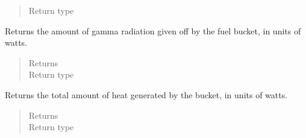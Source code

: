 \documentclass[letterpaper,10pt,openany,oneside,english]{sphinxmanual}
\begin{document}
\begin{fulllineitems}
\begin{fulllineitems}
\begin{quote}
\begin{description}
\item[{Return type}] \leavevmode
{}

\end{description}\end{quote}

\end{fulllineitems}


\begin{fulllineitems}
\label{\detokenize{support_rst/fuel_bucket:fuel_bucket.FuelBucket.get_gamma_pwr}}
Returns the amount of gamma radiation given off by the fuel bucket,
in units of watts.
\begin{quote}\begin{description}
\item[{Returns}] \leavevmode
{}

\item[{Return type}] \leavevmode
{}

\end{description}\end{quote}

\end{fulllineitems}


\begin{fulllineitems}
\label{\detokenize{support_rst/fuel_bucket:fuel_bucket.FuelBucket.get_heat_pwr}}
Returns the total amount of heat generated by the bucket, in units of
watts.
\begin{quote}\begin{description}
\item[{Returns}] \leavevmode
{}

\item[{Return type}] \leavevmode
{}

\end{description}\end{quote}

\end{fulllineitems}


\end{fulllineitems}
\end{document}
